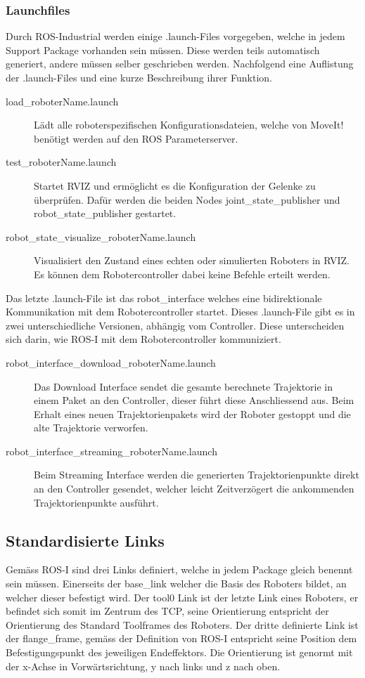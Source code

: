\subsubsection{Launchfiles}
Durch ROS-Industrial werden einige .launch-Files vorgegeben, welche in jedem Support Package vorhanden sein müssen. Diese werden teils automatisch generiert, andere müssen selber geschrieben werden. Nachfolgend eine Auflistung der .launch-Files und eine kurze Beschreibung ihrer Funktion.
\begin{description}
	\item[load\_roboterName.launch] Lädt alle roboterspezifischen Konfigurationsdateien, welche von MoveIt! benötigt werden auf den ROS Parameterserver.
	\item[test\_roboterName.launch] Startet RVIZ und ermöglicht es die Konfiguration der Gelenke zu überprüfen. Dafür werden die beiden Nodes joint\_state\_publisher und robot\_state\_publisher gestartet.
	\item[robot\_state\_visualize\_roboterName.launch] Visualisiert den Zustand eines echten oder simulierten Roboters in RVIZ. Es können dem Robotercontroller dabei keine Befehle erteilt werden.
\end{description}
Das letzte .launch-File ist das robot\_interface welches eine bidirektionale Kommunikation mit dem Robotercontroller startet. Dieses .launch-File gibt es in zwei unterschiedliche Versionen, abhängig vom Controller. Diese unterscheiden sich darin, wie ROS-I mit dem Robotercontroller kommuniziert. 
\begin{description}
	\item[robot\_interface\_download\_roboterName.launch] Das Download Interface sendet die gesamte berechnete Trajektorie in einem Paket an den Controller, dieser führt diese Anschliessend aus. Beim Erhalt eines neuen Trajektorienpakets wird der Roboter gestoppt und die alte Trajektorie verworfen. 
	\item[robot\_interface\_streaming\_roboterName.launch] Beim Streaming Interface werden die generierten Trajektorienpunkte direkt an den Controller gesendet, welcher leicht Zeitverzögert die ankommenden Trajektorienpunkte ausführt.
\end{description}

\subsection{Standardisierte Links}
Gemäss ROS-I sind drei Links definiert, welche in jedem Package gleich benennt sein müssen. Einerseits der base\_link welcher die Basis des Roboters bildet, an welcher dieser befestigt wird. Der tool0 Link ist der letzte Link eines Roboters, er befindet sich somit im Zentrum des \gls{TCP}, seine Orientierung entspricht der Orientierung des Standard Toolframes des Roboters. Der dritte definierte Link ist der flange\_frame, gemäss der Definition von ROS-I entspricht seine Position dem Befestigungspunkt des jeweiligen Endeffektors. Die Orientierung ist genormt mit der x-Achse in Vorwärtsrichtung, y nach links und z nach oben.

